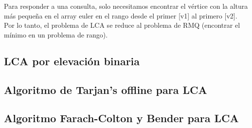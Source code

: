 Para responder a una consulta, solo necesitamos encontrar el vértice con la altura más pequeña en el array euler en el rango desde el primer [v1] al primero [v2]. Por lo tanto, el problema de LCA se reduce al problema de RMQ (encontrar el mínimo en un problema de rango).



\subsection{LCA por elevación binaria}


\subsection{Algoritmo de Tarjan's offline para LCA}


\subsection{Algoritmo Farach-Colton y Bender para LCA}




 